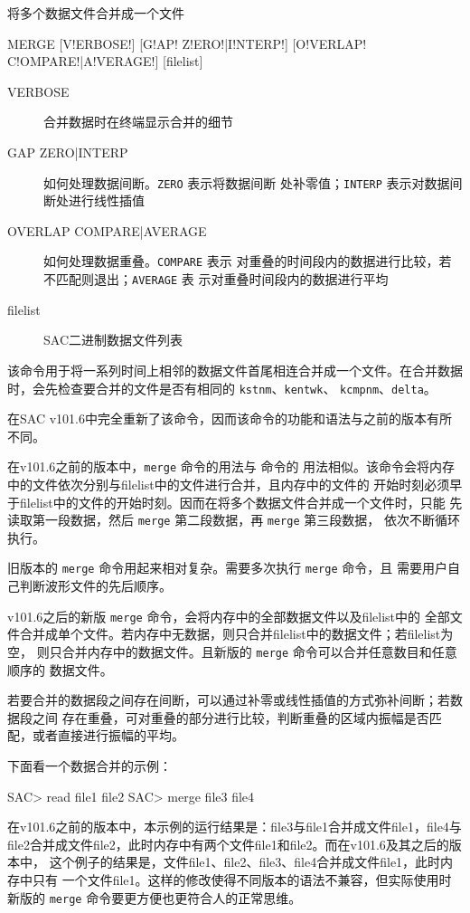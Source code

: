 \label{cmd:merge}

将多个数据文件合并成一个文件

\begin{SACSTX}
MERGE [V!ERBOSE!] [G!AP! Z!ERO!|I!NTERP!] [O!VERLAP! C!OMPARE!|A!VERAGE!] [filelist]
\end{SACSTX}

\begin{description}
\item [VERBOSE] 合并数据时在终端显示合并的细节
\item [GAP ZERO|INTERP] 如何处理数据间断。\texttt{ZERO} 表示将数据间断
    处补零值；\texttt{INTERP} 表示对数据间断处进行线性插值
\item [OVERLAP COMPARE|AVERAGE] 如何处理数据重叠。\texttt{COMPARE} 表示
    对重叠的时间段内的数据进行比较，若不匹配则退出；\texttt{AVERAGE} 表
    示对重叠时间段内的数据进行平均
\item [filelist] SAC二进制数据文件列表
\end{description}

该命令用于将一系列时间上相邻的数据文件首尾相连合并成一个文件。在合并数据
时，会先检查要合并的文件是否有相同的 \texttt{kstnm}、\texttt{kentwk}、
\texttt{kcmpnm}、\texttt{delta}。

在SAC v101.6中完全重新了该命令，因而该命令的功能和语法与之前的版本有所
不同。

在v101.6之前的版本中，\texttt{merge} 命令的用法与  命令的
用法相似。该命令会将内存中的文件依次分别与filelist中的文件进行合并，且内存中的文件的
开始时刻必须早于filelist中的文件的开始时刻。因而在将多个数据文件合并成一个文件时，只能
先读取第一段数据，然后 \texttt{merge} 第二段数据，再 \texttt{merge} 第三段数据，
依次不断循环执行。

旧版本的 \texttt{merge} 命令用起来相对复杂。需要多次执行 \texttt{merge} 命令，且
需要用户自己判断波形文件的先后顺序。

v101.6之后的新版 \texttt{merge} 命令，会将内存中的全部数据文件以及filelist中的
全部文件合并成单个文件。若内存中无数据，则只合并filelist中的数据文件；若filelist为空，
则只合并内存中的数据文件。且新版的 \texttt{merge} 命令可以合并任意数目和任意顺序的
数据文件。

若要合并的数据段之间存在间断，可以通过补零或线性插值的方式弥补间断；若数据段之间
存在重叠，可对重叠的部分进行比较，判断重叠的区域内振幅是否匹配，或者直接进行振幅的平均。

下面看一个数据合并的示例：
\begin{SACCode}
SAC> read file1 file2
SAC> merge file3 file4
\end{SACCode}
在v101.6之前的版本中，本示例的运行结果是：file3与file1合并成文件file1，file4与
file2合并成文件file2，此时内存中有两个文件file1和file2。而在v101.6及其之后的版本中，
这个例子的结果是，文件file1、file2、file3、file4合并成文件file1，此时内存中只有
一个文件file1。这样的修改使得不同版本的语法不兼容，但实际使用时新版的 \texttt{merge}
命令要更方便也更符合人的正常思维。

